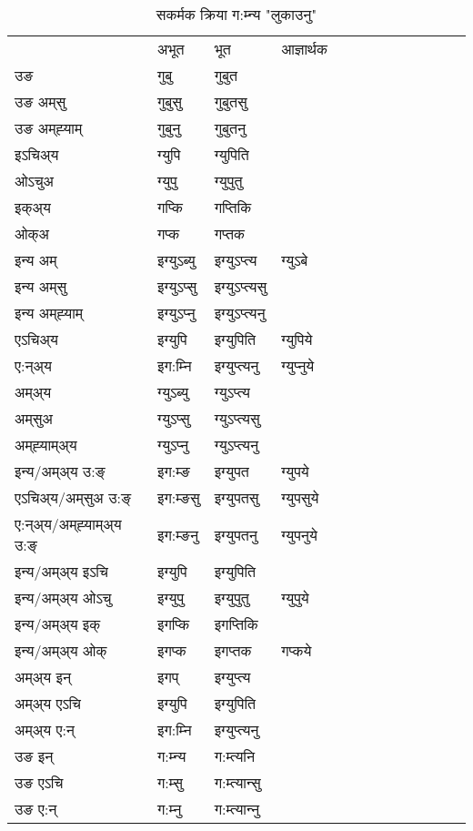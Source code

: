 \begin{table}[H]
\centering
\caption{\label{up.vt} सकर्मक क्रिया  ग:म्‍न्य  "लुकाउनु"  }
\begin{tabular}{l|l|l|l|l|l|l|l|l|l|l|l|l}  \toprule
&अभूत & भूत & आज्ञार्थक \\ 
उङ &गुबु &गुबुत \\ 
उङ अम्‌सु &गुबुसु &गुबुतसु \\ 
उङ अम्‌ह्‍याम् &गुबुनु &गुबुतनु \\ 
इऽचिअ्य &ग्युपि &ग्युपिति   \\ 
ओऽचुअ &ग्युपु &ग्युपुतु   \\ 
इक्अ्य &गप्कि &गप्‍तिकि   \\ 
ओक्अ &गप्क &गप्‍तक   \\ 
इन्य अम् & इग्युऽब्यु  & इग्युऽप्‍त्य &ग्युऽबे  \\ 
इन्य अम्‌सु & इग्युऽप्सु  & इग्युऽप्‍त्यसु   \\ 
इन्य अम्‌ह्‍याम् & इग्युऽप्‍नु  & इग्युऽप्‍त्यनु   \\ 
एऽचिअ्य & इग्युपि & इग्युपिति &ग्युपिये    \\ 
ए:न्अ्य & इग:म्‍नि  & इग्युप्‍त्यनु &ग्युप्‍नुये  \\ 
अम्अ्य & ग्युऽब्यु  & ग्युऽप्‍त्य  \\ 
अम्‌सुअ & ग्युऽप्सु & ग्युऽप्‍त्यसु  \\ 
अम्‌ह्‍याम्अ्य & ग्युऽप्‍नु  & ग्युऽप्‍त्यनु \\ 
\midrule
इन्य/अम्अ्य उ:ङ्‌&इग:म्ङ & इग्युपत &ग्युपये \\ 
एऽचिअ्य/अम्‌सुअ उ:ङ्‌ &इग:म्ङसु & इग्युपतसु &ग्युपसुये \\ 
ए:न्अ्य/अम्‌ह्‍याम्अ्य उ:ङ्‌ &इग:म्ङनु & इग्युपतनु &ग्युपनुये \\ 
इन्य/अम्अ्य इऽचि & इग्युपि & इग्युपिति    \\ 
इन्य/अम्अ्य ओऽचु & इग्युपु & इग्युपुतु  &ग्युपुये  \\ 
इन्य/अम्अ्य इक् & इगप्कि & इगप्‍तिकि   \\ 
इन्य/अम्अ्य ओक् & इगप्क & इगप्‍तक  &गप्कये  \\ 
अम्अ्य इन् & इगप् & इग्युप्‍त्य   \\ 
अम्अ्य एऽचि & इग्युपि & इग्युपिति    \\ 
अम्अ्य ए:न् & इग:म्‍नि  & इग्युप्‍त्यनु  \\ 
\midrule
उङ इन् & ग:म्‍न्य  & ग:म्त्यनि  \\ 
उङ एऽचि & ग:म्सु  & ग:म्त्यान्सु   \\ 
उङ ए:न्& ग:म्‍नु  & ग:म्त्यान्‍नु   \\ 
\bottomrule
\end{tabular}
\end{table}


